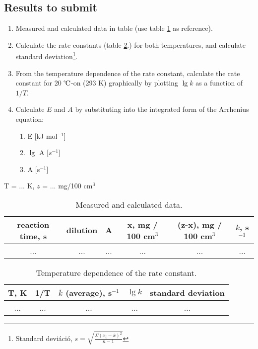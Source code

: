 \subsection{Results to submit}

\begin{enumerate}
\item Measured and calculated data in table (use table \ref{table:tablazatos} as reference).
\item Calculate the rate constants (table \ref{table:seb}.) for both temperatures, and calculate standard deviation\footnote{Standard deviáció, $s=\sqrt{\frac{\Sigma(x_i-\overline{x})^2}{n-1}}$}.
\item From the temperature dependence of the rate constant, calculate the rate constant for 20 $\celsius$-on (293 K) graphically by plotting $\lg k$ as a function of $1/T$.
\item Calculate $E$ and $A$ by substituting into the integrated form of the Arrhenius equation:
	\begin{enumerate}
		\item E [kJ mol$^{-1}$]
		\item $\lg$ A [$s^{-1}$]
		\item A [s$^{-1}$]
	\end{enumerate}
\end{enumerate}

\begin{table}[!h]
\caption{Measured and calculated data.}
\centering
T = ... K, $z$ = ... mg/100 cm$^3$
\begin{tabular}{|c|c|c|c|c|c|}
\hline
reaction time, s&dilution&A&x, mg / 100 cm$^3$ &(z-x), mg / 100 cm$^3$ & $k$, s$^{-1}$ \\
\hline
... & ... & ... & ... & ... & ... \\
\end{tabular}
\label{table:tablazatos}
\end{table}

\begin{table}[!h]
\caption{Temperature dependence of the rate constant.}
\centering
\begin{tabular}{|c|c|c|c|c|}
\hline
T, K& 1/T & $\overline{k}$ (average), s$^{-1}$ & $\lg k$ & standard deviation \\
\hline
... & ... & ... & ... & ... \\
\end{tabular}
\label{table:seb}
\end{table}
